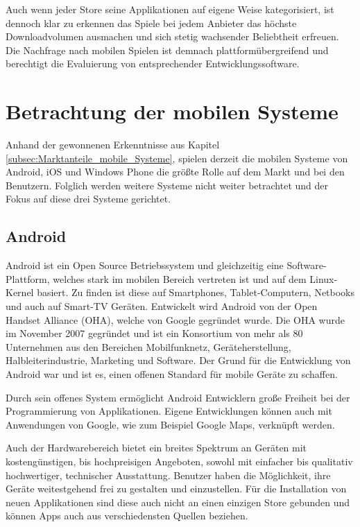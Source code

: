 Auch wenn jeder Store seine Applikationen auf eigene Weise kategorisiert, ist dennoch klar zu erkennen das Spiele bei jedem Anbieter das höchste Downloadvolumen ausmachen und sich stetig wachsender Beliebtheit erfreuen. Die Nachfrage nach mobilen Spielen ist demnach plattformübergreifend und berechtigt die Evaluierung von entsprechender Entwicklungssoftware.

\section{Betrachtung der mobilen Systeme}
Anhand der gewonnenen Erkenntnisse aus Kapitel \ref{subsec:Marktanteile_mobile_Systeme}, spielen derzeit die mobilen Systeme von Android, iOS und Windows Phone die größte Rolle auf dem Markt und bei den Benutzern. Folglich werden weitere Systeme nicht weiter betrachtet und der Fokus auf diese drei Systeme gerichtet.

\subsection{Android}
Android ist ein Open Source Betriebssystem und gleichzeitig eine Software-Plattform, welches stark im mobilen Bereich vertreten ist und auf dem Linux-Kernel basiert. Zu finden ist diese auf Smartphones, Tablet-Computern, Netbooks und auch auf Smart-TV Geräten. \citep{android_overview} Entwickelt wird Android von der Open Handset Alliance (OHA), welche von Google gegründet wurde. Die OHA wurde im November 2007 gegründet und ist ein Konsortium von mehr als 80 Unternehmen aus den Bereichen Mobilfunknetz, Geräteherstellung, Halbleiterindustrie, Marketing und Software. \citep{alliance_members} Der Grund für die Entwicklung von Android war und ist es, einen offenen Standard für mobile Geräte zu schaffen. \citep{alliance_overview}

Durch sein offenes System ermöglicht Android Entwicklern große Freiheit bei der Programmierung von Applikationen. Eigene Entwicklungen können auch mit Anwendungen von Google, wie zum Beispiel Google Maps, verknüpft werden.

Auch der Hardwarebereich bietet ein breites Spektrum an Geräten mit kostengünstigen, bis hochpreisigen Angeboten, sowohl mit einfacher bis qualitativ hochwertiger, technischer Ausstattung. Benutzer haben die Möglichkeit, ihre Geräte weitestgehend frei zu gestalten und einzustellen. Für die Installation von neuen Applikationen sind diese auch nicht an einen einzigen Store gebunden und können Apps auch aus verschiedensten Quellen beziehen.
\\

